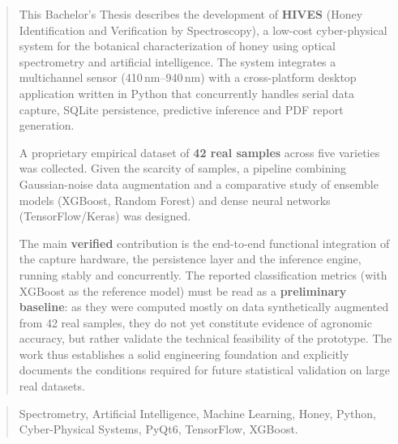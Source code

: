 \documentclass[a4paper,12pt,twoside]{memoir}
\begin{document}
\clearpage
\renewcommand*\abstractname{Abstract}
\begin{abstract}
This Bachelor's Thesis describes the development of \textbf{HIVES} (Honey
Identification and Verification by Spectroscopy), a low-cost cyber-physical system
for the botanical characterization of honey using optical spectrometry and artificial
intelligence. The system integrates a multichannel sensor (410\,nm--940\,nm) with a
cross-platform desktop application written in Python that concurrently handles serial
data capture, SQLite persistence, predictive inference and PDF report generation.

A proprietary empirical dataset of \textbf{42 real samples} across five varieties was
collected. Given the scarcity of samples, a pipeline combining Gaussian-noise data
augmentation and a comparative study of ensemble models (XGBoost, Random Forest) and
dense neural networks (TensorFlow/Keras) was designed.

The main \textbf{verified} contribution is the end-to-end functional integration of the
capture hardware, the persistence layer and the inference engine, running stably and
concurrently. The reported classification metrics (with XGBoost as the reference model)
must be read as a \textbf{preliminary baseline}: as they were computed mostly on data
synthetically augmented from 42 real samples, they do not yet constitute evidence of
agronomic accuracy, but rather validate the technical feasibility of the prototype.
The work thus establishes a solid engineering foundation and explicitly documents the
conditions required for future statistical validation on large real datasets.
\end{abstract}

\renewcommand*\abstractname{Keywords}
\begin{abstract}
Spectrometry, Artificial Intelligence, Machine Learning, Honey, Python, Cyber-Physical Systems, PyQt6, TensorFlow, XGBoost.
\end{abstract}

\clearpage

\tableofcontents

\clearpage

\listoffigures

\clearpage

\listoftables
\clearpage

\mainmatter











\end{document}
